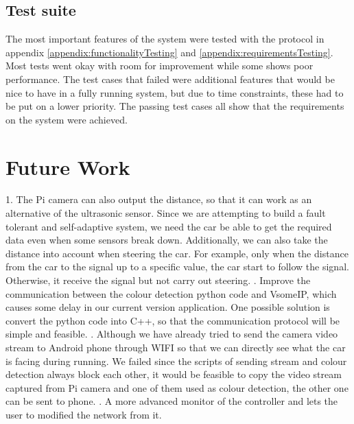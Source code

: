 \documentclass[11pt, titlepage]{article} %
\begin{document}
\subsection{Test suite}
The most important features of the system were tested with the protocol in appendix \ref{appendix:functionalityTesting} and \ref{appendix:requirementsTesting}. Most tests went okay with room for improvement while some shows poor performance. The test cases that failed were additional features that would be nice to have in a fully running system, but due to time constraints, these had to be put on a lower priority. The passing test cases all show that the requirements on the system were achieved.



\clearpage
\section{Future Work}
1.	The Pi camera can also output the distance, so that it can work as an alternative of the ultrasonic sensor. Since we are attempting to build a fault tolerant and self-adaptive system, we need the car be able to get the required data even when some sensors break down. Additionally, we can also take the distance into account when steering the car. For example, only when the distance from the car to the signal up to a specific value, the car start to follow the signal. Otherwise, it receive the signal but not carry out steering.
.	Improve the communication between the colour detection python code and VsomeIP, which causes some delay in our current version application. One possible solution is convert the python code into C++, so that the communication protocol will be simple and feasible.
.	Although we have already tried to send the camera video stream to Android phone through WIFI so that we can directly see what the car is facing during running. We failed since the scripts of sending stream and colour detection always block each other, it would be feasible to copy the video stream captured from Pi camera and one of them used as colour detection, the other one can be sent to phone.
. A more advanced monitor of the controller and lets the user to modified the network from it. 
\clearpage
\end{document}
